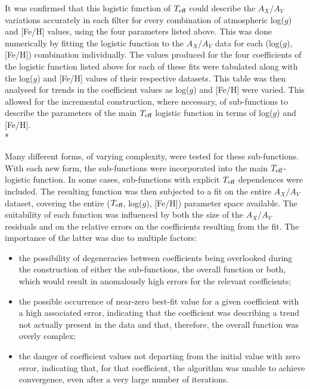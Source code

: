\documentclass[12pt, a4paper]{report}
\begin{document}
It was confirmed that this logistic function of $T_{\textnormal{eff}}$ could describe the $A_{X}/A_{V}$ variations accurately in each filter for every combination of atmospheric log($g$) and [Fe/H] values, using the four parameters listed above. This was done numerically by fitting the logistic function to the $A_{X}/A_{V}$ data for each (log($g$),[Fe/H]) combination individually. The values produced for the four coefficients of the logistic function listed above for each of these fits were tabulated along with the log($g$) and [Fe/H] values of their respective datasets. This table was then analysed for trends in the coefficient values as log($g$) and [Fe/H] were varied. This allowed for the incremental construction, where necessary, of sub-functions to describe the parameters of the main $T_{\textnormal{eff}}$ logistic function in terms of log($g$) and [Fe/H].\\*

Many different forms, of varying complexity, were tested for these sub-functions. With each new form, the sub-functions were incorporated into the main $T_{\textnormal{eff}}$-logistic function. In some cases, sub-functions with explicit $T_{\textnormal{eff}}$ dependences were included. The resulting function was then subjected to a fit on the entire $A_{X}/A_{V}$ dataset, covering the entire ($T_{\textnormal{eff}}$,  log($g$), [Fe/H]) parameter space available. The suitability of each function was influenced by both the size of the $A_{X}/A_{V}$ residuals and on the relative errors on the coefficients resulting from the fit. The importance of the latter was due to multiple factors:

\begin{itemize}
\item the possibility of degeneracies between coefficients being overlooked during the construction of either the sub-functions, the overall function or both, which would result in anomalously high errors for the relevant coefficients;
\item the possible occurrence of near-zero best-fit value for a given coefficient with a high associated error, indicating that the coefficient was describing a trend not actually present in the data and that, therefore, the overall function was overly complex;
\item the danger of coefficient values not departing from the initial value with zero error, indicating that, for that coefficient, the algorithm was unable to achieve convergence, even after a very large number of iterations.
\end{itemize}
\end{document}
